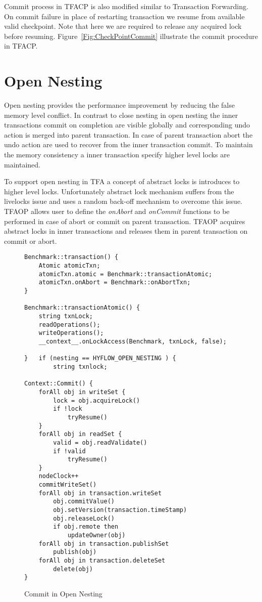 \documentclass[12pt,english]{report}
\begin{document}
Commit process in TFACP is also modified similar to Transaction Forwarding. On commit failure in place of restarting transaction we resume from available valid checkpoint. Note that here we are required to release any acquired lock before resuming. Figure~\ref{Fig:CheckPointCommit} illustrate the commit procedure in TFACP. 


\section{Open Nesting}

Open nesting provides the performance improvement by reducing the false memory level conflict. In contrast to close nesting in open nesting the inner transactions commit on completion are visible globally and corresponding undo action is merged into parent transaction. In case of parent transaction abort the undo action are used to recover from the inner transaction commit. To maintain the memory consistency a inner transaction specify higher level locks are maintained.  

To support open nesting in TFA a concept of abstract locks is introduces to higher level locks. Unfortunately abstract lock mechanism suffers from the livelocks issue and uses a random back-off mechanism to overcome this issue. TFAOP allows user to define the \textit{onAbort} and \textit{onCommit} functions to be performed in case of abort or commit on parent transaction. TFAOP acquires abstract locks in inner transactions and releases them in parent transaction on commit or abort. 

\begin{figure}
\begin{minipage}[b]{0.9\linewidth}\centering
\begin{lstlisting}
Benchmark::transaction() {
	Atomic atomicTxn;
	atomicTxn.atomic = Benchmark::transactionAtomic;
	atomicTxn.onAbort = Benchmark::onAbortTxn;
}

Benchmark::transactionAtomic() {
    string txnLock;
	readOperations();
	writeOperations();
	__context__.onLockAccess(Benchmark, txnLock, false);
	
}	if (nesting == HYFLOW_OPEN_NESTING ) {
		string txnlock;

Context::Commit() {
	forAll obj in writeSet {
		lock = obj.acquireLock()
		if !lock
			tryResume()
	}
	forAll obj in readSet {
		valid = obj.readValidate()
		if !valid
			tryResume()
	}
	nodeClock++
	commitWriteSet()
	forAll obj in transaction.writeSet
		obj.commitValue()
 		obj.setVersion(transaction.timeStamp)
 		obj.releaseLock()
 		if obj.remote then
 			updateOwner(obj)
	forAll obj in transaction.publishSet
		publish(obj)
	forAll obj in transaction.deleteSet
		delete(obj)
}
\end{lstlisting}
\end{minipage}
\caption{Commit in Open Nesting}
\label{Fig:OpenNestingCommit}
\end{figure}
\end{document}
